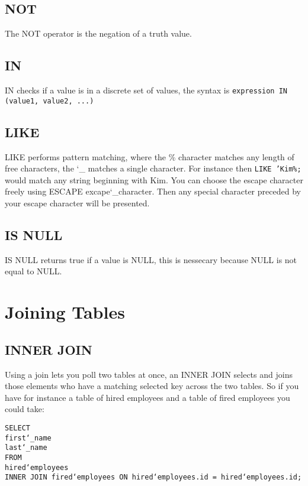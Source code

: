 \documentclass[10pt, english]{article}
\begin{document}
\subsection{NOT}
The NOT operator is the negation of a truth value.

\subsection{IN}
IN checks if a value is in a discrete set of values,
the syntax is \texttt{expression IN (value1, value2, ...)}

\subsection{LIKE}
LIKE performs pattern matching, where the \% character matches any length of free characters,
the \char`_ matches a single character. For instance then \texttt{LIKE 'Kim\%;} would 
match any string beginning with Kim. You can choose the escape character freely using ESCAPE excape\char`_character.
Then any special character preceded by your escape character will be presented.

\subsection{IS NULL}
IS NULL returns true if a value is  NULL, this is nessecary because NULL is not equal to NULL.

\newpage
\section{Joining Tables}
\subsection{INNER JOIN}
Using a join lets you poll two tables at once, an INNER JOIN selects and joins those elements who have a matching selected key across the two tables.
So if you have for instance a table of hired employees and a table of fired employees you could take:

\texttt{SELECT\\
\hspace*{10pt} first\char`_name \\
\hspace*{10pt} last\char`_name \\
FROM \\
\hspace*{10pt} hired\char`employees \\
INNER JOIN fired\char`employees ON hired\char`employees.id = hired\char`employees.id; 
}
\end{document}
